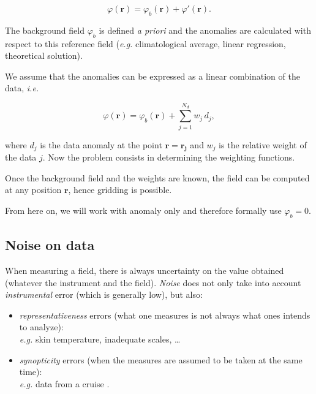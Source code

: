 \begin{equation}
 \varphi(\mathbf{r}) = \varphi_b(\mathbf{r}) + \varphi'(\mathbf{r}).
 \label{background}
\end{equation}

The background field $\varphi_b$ is defined {\it a priori} and the anomalies are calculated with respect to this reference field (\textit{e.g.} climatological average, linear regression, theoretical solution). 

We assume that the anomalies can be expressed as a linear combination of the data, \textit{i.e.}

\begin{equation}
\varphi(\mathbf{r}) = \varphi_b(\mathbf{r}) + \sum_{j=1}^{N_d} w_j\, d_j,
\label{objectiveanal}
\end{equation}

where $d_{j}$ is the data anomaly at the point $\mathbf{r}= \mathbf{r_{j}}$ and $w_j$ is the relative weight of the data $j$. Now the problem consists in determining the weighting functions. 

Once the background field and the weights are known, the field can be computed at any position $\mathbf{r}$, hence gridding is possible.

From here on, we will work with anomaly only and therefore formally use $\varphi_{b}=0$.


\subsection{Noise on data}

When measuring a field, there is always uncertainty on the value obtained (whatever the instrument and the field). \textit{Noise} does not only take into account \textit{instrumental} error (which is generally low), but also:
\begin{itemize}
\item \textit{representativeness} errors (what one measures is not always what ones intends to analyze):\\
\textit{e.g.} skin temperature, inadequate scales, \ldots
\item \textit{synopticity} errors (when the measures are assumed to be taken at the same time):\\
\textit{e.g.} data from a cruise \citep{RIXEN01}.
\end{itemize}

